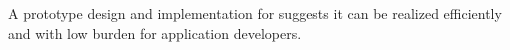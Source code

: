 %
A prototype design and implementation for \name suggests it can be realized
efficiently and with low burden for application developers.
%

\fi
